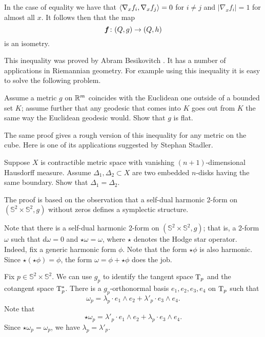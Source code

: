 In the case of equality we have that $\langle\nabla_x f_i,\nabla_x f_j\rangle=0$ for $i\ne j$ 
and $|\nabla_x f_i|=1$ for almost all $x$.
It follows then that the map 
\[\bm{f}\:(Q,g)\z\to (Q,h)\] 
is an isometry.
\qeds

This inequality was proved by Abram Besikovitch \cite[see][]{besicovitch}.
It has a number of applications in Riemannian geometry.
For example using this inequality it is easy to solve the following problem.

\begin{pr}
Assume a metric $g$ on $\mathbb{R}^m$ coincides with the Euclidean one outside of a bounded set $K$;
assume further that any geodesic that comes into $K$ goes out from $K$ the same way the Euclidean geodesic would. 
Show that $g$ is flat.
\end{pr}


The same proof gives a rough version of this inequality for any metric on the cube.
Here is one of its applications suggested by Stephan Stadler.

\begin{pr}
Suppose $X$ is contractible metric space with vanishing $(n+1)$-dimensional Hausdorff measure.
Assume $\Delta_1,\Delta_2\subset X$ are two embedded $n$-disks having the same boundary.
Show that $\Delta_1=\Delta_2$.
\end{pr}



The proof is based on the observation that a self-dual harmonic 2-form on $(\mathbb{S}^2\times\mathbb{S}^2,g)$
without zeros defines a symplectic structure.

\medskip

Note that there is a self-dual harmonic 2-form on $(\mathbb{S}^2\times\mathbb{S}^2,g)$;
that is, a 2-form $\omega$ such that $d\omega=0$ and $\star\omega=\omega$,
where $\star$ denotes the Hodge star operator.
Indeed, fix a generic harmonic form $\phi$.
Note that the form $\star\phi$ is also harmonic.
Since $\star(\star\phi)=\phi$,
the form $\omega=\phi+\star\phi$ does the job.

Fix $p\in \mathbb{S}^2\times\mathbb{S}^2$.
We can use $g_p$ to identify the tangent space $\mathrm{T}_p$ and the cotangent space $\mathrm{T}^*_p$.
There is a $g_p$-orthonormal basis $e_1, e_2, e_3, e_4$ on $\mathrm{T}_p$ such that 
\[\omega_p=\lambda_p\cdot e_1\wedge e_2+\lambda'_p\cdot  e_3\wedge e_4.\]
Note that 
\[\star\omega_p=\lambda'_p\cdot e_1\wedge e_2+\lambda_p\cdot  e_3\wedge e_4.\]
Since $\star\omega_p=\omega_p$, we have $\lambda_p=\lambda'_p$.

